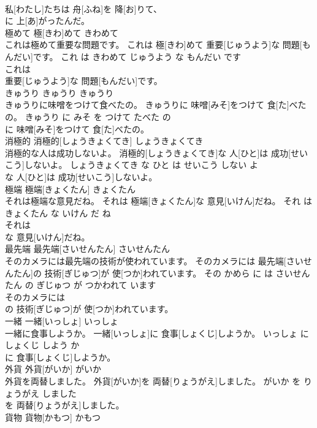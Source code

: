 \documentclass[8pt]{extreport}
\begin{document}
\begin{CJK}{UTF8}{min}
\\	私[わたし]たちは 舟[ふね]を 降[お]りて、
\\	に 上[あ]がったんだ。			
\\	極めて	極[きわ]めて	きわめて	
\\	これは極めて重要な問題です。	これは 極[きわ]めて 重要[じゅうよう]な 問題[もんだい]です。	これ は きわめて じゅうよう な もんだい です	
\\	これは
\\	重要[じゅうよう]な 問題[もんだい]です。			
\\	きゅうり	きゅうり	きゅうり	
\\	きゅうりに味噌をつけて食べたの。	きゅうりに 味噌[みそ]をつけて 食[た]べたの。	きゅうり に みそ を つけて たべた の	
\\	に 味噌[みそ]をつけて 食[た]べたの。			
\\	消極的	消極的[しょうきょくてき]	しょうきょくてき	
\\	消極的な人は成功しないよ。	消極的[しょうきょくてき]な 人[ひと]は 成功[せいこう]しないよ。	しょうきょくてき な ひと は せいこう しない よ	
\\	な 人[ひと]は 成功[せいこう]しないよ。			
\\	極端	極端[きょくたん]	きょくたん	
\\	それは極端な意見だね。	それは 極端[きょくたん]な 意見[いけん]だね。	それ は きょくたん な いけん だ ね	
\\	それは
\\	な 意見[いけん]だね。			
\\	最先端	最先端[さいせんたん]	さいせんたん	
\\	そのカメラには最先端の技術が使われています。	そのカメラには 最先端[さいせんたん]の 技術[ぎじゅつ]が 使[つか]われています。	その かめら に は さいせんたん の ぎじゅつ が つかわれて います	
\\	そのカメラには
\\	の 技術[ぎじゅつ]が 使[つか]われています。			
\\	一緒	一緒[いっしょ]	いっしょ	
\\	一緒に食事しようか。	一緒[いっしょ]に 食事[しょくじ]しようか。	いっしょ に しょくじ しよう か	
\\	に 食事[しょくじ]しようか。			
\\	外貨	外貨[がいか]	がいか	
\\	外貨を両替しました。	外貨[がいか]を 両替[りょうがえ]しました。	がいか を りょうがえ しました	
\\	を 両替[りょうがえ]しました。			
\\	貨物	貨物[かもつ]	かもつ	

\end{CJK}
\end{document}
